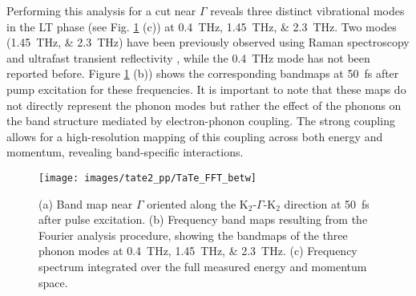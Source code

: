 Performing this analysis for a cut near $\Gamma$ reveals three distinct vibrational modes in the LT phase (see Fig. \ref{fig:TaTe_FFT_betw} (c)) at \qtylist{0.4; 1.45; 2.3}{\tera\hertz}.
Two modes (\qtylist{1.45; 2.3}{\tera\hertz}) have been previously observed using Raman spectroscopy and ultrafast transient reflectivity \cite{luo_subtle_2021, hu_optical_2022}, while the \qty{0.4}{\tera\hertz} mode has not been reported before.
Figure \ref{fig:TaTe_FFT_betw} (b)) shows the corresponding bandmaps at \qty{50}{\femto\second} after pump excitation for these frequencies.
It is important to note that these maps do not directly represent the phonon modes but rather the effect of the phonons on the band structure mediated by electron-phonon coupling.
The strong coupling allows for a high-resolution mapping of this coupling across both energy and momentum, revealing band-specific interactions.

\begin{figure}[t]
	\centering
	\texttt{[image: images/tate2\_pp/TaTe\_FFT\_betw]}
	\caption{(a) Band map near $\Gamma$ oriented along the K$_2$-$\Gamma$-K$_2$ direction at \qty{50}{\femto\second} after pulse excitation. (b) Frequency band maps resulting from the Fourier analysis procedure, showing the bandmaps of the three phonon modes at \qtylist{0.4;1.45;2.3}{\tera\hertz}. (c) Frequency spectrum integrated over the full measured energy and momentum space.}
	\label{fig:TaTe_FFT_betw}
\end{figure}

